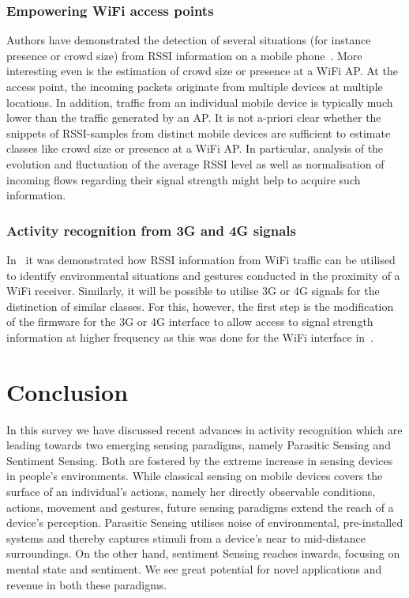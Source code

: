 \documentclass[journal]{IEEEtran}
\begin{document}
\begin{figure*}
\subsubsection{Empowering WiFi access points}
Authors have demonstrated the detection of several situations (for instance presence or crowd size) from RSSI information on a mobile phone~\cite{RFSensing_Sigg_2014}.
More interesting even is the estimation of crowd size or presence at a WiFi AP.
At the access point, the incoming packets originate from multiple devices at multiple locations.
In addition, traffic from an individual mobile device is typically much lower than the traffic generated by an AP.
It is not a-priori clear whether the snippets of RSSI-samples from distinct mobile devices are sufficient to estimate classes like crowd size or presence at a WiFi AP.
In particular, analysis of the evolution and fluctuation of the average RSSI level as well as normalisation of incoming flows regarding their signal strength might help to acquire such information.

\subsubsection{Activity recognition from 3G and 4G signals}
In~\cite{RFSensing_Sigg_2014} it was demonstrated how RSSI information from WiFi traffic can be utilised to identify environmental situations and gestures conducted in the proximity of a WiFi receiver.
Similarly, it will be possible to utilise 3G or 4G signals for the distinction of similar classes.
For this, however, the first step is the modification of the firmware for the 3G or 4G interface to allow access to signal strength information at higher frequency as this was done for the WiFi interface in~\cite{RFSensing_Sigg_2014}.

\section{Conclusion}
In this survey we have discussed recent advances in activity recognition which are leading towards two emerging sensing paradigms, namely Parasitic Sensing and Sentiment Sensing.
Both are fostered by the extreme increase in sensing devices in people's environments.
While classical sensing on mobile devices covers the surface of an individual's actions, namely her directly observable conditions, actions, movement and gestures, future sensing paradigms extend the reach of a device's perception.
Parasitic Sensing utilises noise of environmental, pre-installed systems and thereby captures stimuli from a device's near to mid-distance surroundings. 
On the other hand, sentiment Sensing reaches inwards, focusing on mental state and sentiment.
We see great potential for novel applications and revenue in both these paradigms.


\end{figure*}
\end{document}
